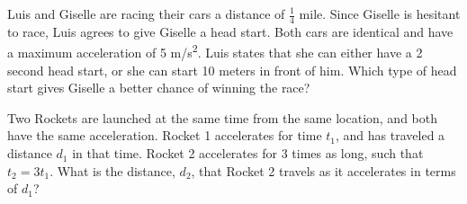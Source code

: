 \documentclass[11pt]{examdesign}
\begin{document}
\begin{multiplechoice} [title={Multiple Choice},
	rearrange=yes]
\begin{question}
	
\end{question}


\begin{question}
Luis and Giselle are racing their cars a distance of $\frac{1}{4}$ mile.  Since Giselle is hesitant to race, Luis agrees to give Giselle a head start.  Both cars are identical and have a maximum acceleration of 5 m/s\textsuperscript{2}.  Luis states that she can either have a 2 second head start, or she can start 10 meters in front of him.  Which type of head start gives Giselle a better chance of winning the race?
	
\end{question}


\begin{question}
Two Rockets are launched at the same time from the same location, and both have the same acceleration.  Rocket 1 accelerates for time $t_1$, and has traveled a distance $d_1$ in that time. Rocket 2 accelerates for 3 times as long, such that $t_2 = 3 t_1$.   What is the distance, $d_2$, that Rocket 2 travels as it accelerates in terms of $d_1$?


\end{question}


\end{multiplechoice}
\end{document}

